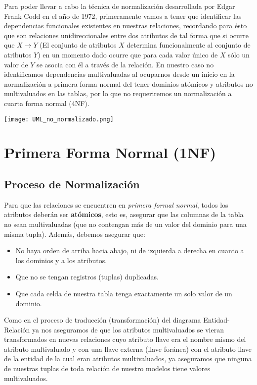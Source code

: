 \documentclass[11pt,letterpaper]{article}
\begin{document}
Para poder llevar a cabo la técnica de normalización desarrollada por Edgar Frank Codd en el año de 1972, primeramente vamos a tener que identificar las dependencias funcionales existentes en nuestras relaciones, recordando para ésto que son relaciones unidireccionales entre dos atributos de tal forma que si ocurre que $X\rightarrow Y$ (El conjunto de atributos $X$ determina funcionalmente al conjunto de atributos $Y$) en un momento dado ocurre que para cada valor único de $X$ sólo un valor de $Y$ se asocia con él a través de la relación. En nuestro caso no identificamos dependencias multivaluadas al ocuparnos desde un inicio en la normalización a primera forma normal del tener dominios atómicos y atributos no multivaluados en las tablas, por lo que no requeriremos un normalización a cuarta forma normal (4NF). 
\begin{center}
\texttt{[image: UML\_no\_normalizado.png]}
\end{center}



\section{Primera Forma Normal (1NF)}

\subsection{Proceso de Normalización}

Para que las relaciones se encuentren en \textit{primera formal normal}, todos los atributos deberán ser \textbf{atómicos}, esto es, asegurar que las columnas de la tabla no sean multivaluadas (que no contengan más de un valor del dominio para una misma tupla). Además, debemos asegurar que:

\begin{itemize}
\item No haya orden de arriba hacia abajo, ni de izquierda a derecha en cuanto a los dominios y a los atributos.
\item Que no se tengan registros (tuplas) duplicadas.
\item Que cada celda de nuestra tabla tenga exactamente un solo valor de un dominio.
\end{itemize}

Como en el proceso de traducción (transformación) del diagrama Entidad-Relación ya nos aseguramos de que los atributos multivaluados se vieran transformados en nuevas relaciones cuyo atributo llave era el nombre mismo del atributo multivaluado y con una llave externa (llave foránea) con el atributo llave de la entidad de la cual eran atributos multivaluados, ya aseguramos que ninguna de nuestras tuplas de toda relación de nuestro modelos tiene valores multivaluados.\\
\end{document}
